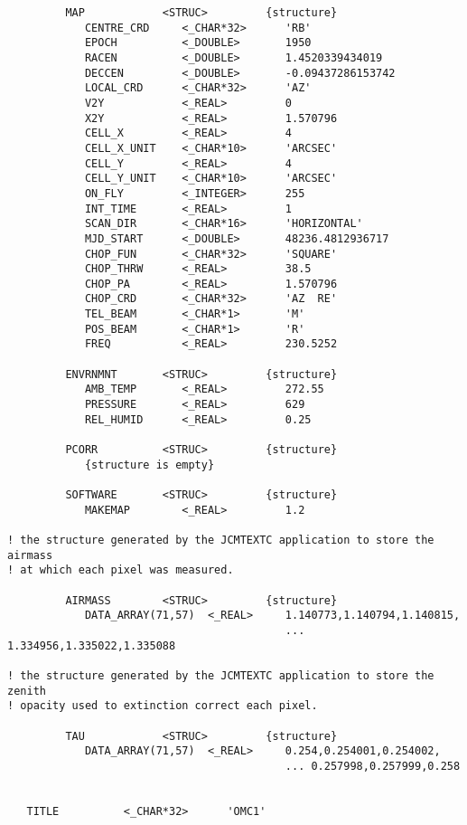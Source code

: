 \begin{small}
\begin{verbatim}
         MAP            <STRUC>         {structure}
            CENTRE_CRD     <_CHAR*32>      'RB'
            EPOCH          <_DOUBLE>       1950
            RACEN          <_DOUBLE>       1.4520339434019
            DECCEN         <_DOUBLE>       -0.09437286153742
            LOCAL_CRD      <_CHAR*32>      'AZ'
            V2Y            <_REAL>         0
            X2Y            <_REAL>         1.570796
            CELL_X         <_REAL>         4
            CELL_X_UNIT    <_CHAR*10>      'ARCSEC'
            CELL_Y         <_REAL>         4
            CELL_Y_UNIT    <_CHAR*10>      'ARCSEC'
            ON_FLY         <_INTEGER>      255
            INT_TIME       <_REAL>         1
            SCAN_DIR       <_CHAR*16>      'HORIZONTAL'
            MJD_START      <_DOUBLE>       48236.4812936717
            CHOP_FUN       <_CHAR*32>      'SQUARE'
            CHOP_THRW      <_REAL>         38.5
            CHOP_PA        <_REAL>         1.570796
            CHOP_CRD       <_CHAR*32>      'AZ  RE'
            TEL_BEAM       <_CHAR*1>       'M'
            POS_BEAM       <_CHAR*1>       'R'
            FREQ           <_REAL>         230.5252

         ENVRNMNT       <STRUC>         {structure}
            AMB_TEMP       <_REAL>         272.55
            PRESSURE       <_REAL>         629
            REL_HUMID      <_REAL>         0.25

         PCORR          <STRUC>         {structure}
            {structure is empty}

         SOFTWARE       <STRUC>         {structure}
            MAKEMAP        <_REAL>         1.2

! the structure generated by the JCMTEXTC application to store the airmass
! at which each pixel was measured.

         AIRMASS        <STRUC>         {structure}
            DATA_ARRAY(71,57)  <_REAL>     1.140773,1.140794,1.140815,
                                           ... 1.334956,1.335022,1.335088

! the structure generated by the JCMTEXTC application to store the zenith
! opacity used to extinction correct each pixel.

         TAU            <STRUC>         {structure}
            DATA_ARRAY(71,57)  <_REAL>     0.254,0.254001,0.254002,
                                           ... 0.257998,0.257999,0.258


   TITLE          <_CHAR*32>      'OMC1'
\end{verbatim}
\end{small}

